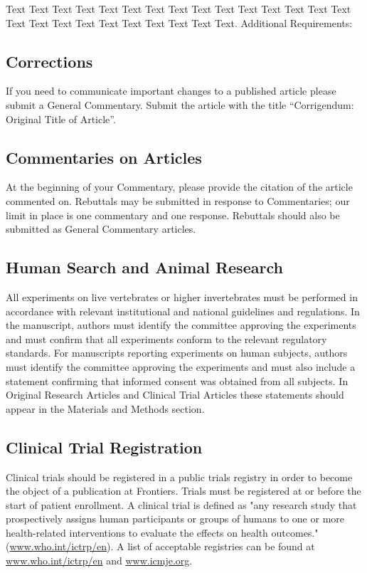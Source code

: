 \documentclass{frontiersSCNS} %
\begin{document}
Text Text Text Text Text Text  Text Text Text Text Text Text Text Text Text  Text Text Text Text Text Text Text Text Text Text.
Additional Requirements:
\subsection{Corrections}

If you need to communicate important changes to a published article please submit a General Commentary. Submit the article with the title “Corrigendum: Original Title of Article”.

\subsection{Commentaries on Articles}

At the beginning of your Commentary, please provide the citation of the article commented on. Rebuttals may be submitted in response to Commentaries; our limit in place is one commentary and one response. Rebuttals should also be submitted as General Commentary articles.

\subsection{Human Search and Animal Research}

All experiments on live vertebrates or higher invertebrates must be performed in accordance with relevant institutional and national guidelines and regulations. In the manuscript, authors must identify the committee approving the experiments and must confirm that all experiments conform to the relevant regulatory standards. For manuscripts reporting experiments on human subjects, authors must identify the committee approving the experiments and must also include a statement confirming that informed consent was obtained from all subjects. In Original Research Articles and Clinical Trial Articles these statements should appear in the Materials and Methods section.

\subsection{Clinical Trial Registration}

Clinical trials should be registered in a public trials registry in order to become the object of a publication at Frontiers. Trials must be registered at or before the start of patient enrollment. A clinical trial is defined as "any research study that prospectively assigns human participants or groups of humans to one or more health-related interventions to evaluate the effects on health outcomes."(\href{www.who.int/ictrp/en}{www.who.int/ictrp/en}). A list of acceptable registries can be found at \href{www.who.int/ictrp/en}{www.who.int/ictrp/en} and \href{www.icmje.org}{www.icmje.org}.
\end{document}
